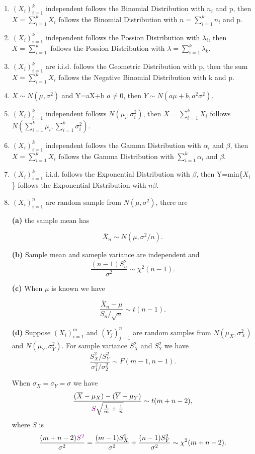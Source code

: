 \documentclass[landscape,12pt,a3paper]{article}
\begin{document}
\begin{enumerate}

\item $\displaystyle (X_i)_{i=1}^k$ independent follows the Binomial Distribution with $n_i$ and p, then $X=\sum_{i=1}^kX_i$ follows the Binomial Distribution with $n=\sum_{i=1}^kn_i$ and p.

\item $(X_i)_{i=1}^k$ independent follows the Possion Distribution with $\lambda_i$, then $X=\sum_{i=1}^k$ follows the Possion Distribution with $\lambda=\sum_{i=1}^k\lambda_k$.

\item $(X_i)_{i=1}^k$ are i.i.d. follows the Geometric Distribution with p, then the sum $X=\sum_{i=1}^kX_i$ follows the Negative Binomial Distribution with k and p.

\item $X\sim N(\mu,\sigma^2)$ and Y=aX+b $a\neq 0$, then $Y\sim N(a\mu+b,a^2\sigma^2)$.

\item $(X_i)_{i=1}^k$ independent follows $N(\mu_i,\sigma_i^2)$, then $X=\sum_{i=1}^kX_i$ follows $N(\sum_{i=1}^k\mu_i,\sum_{i=1}^k\sigma_i^2)$.

\item $(X_i)_{i=1}^k$ independent follows the Gamma Distribution with $\alpha_i$ and $\beta$, then $X=\sum_{i=1}^kX_i$ follows the Gamma Distribution with $\sum_{i=1}^k\alpha_i$ and $\beta$.

\item $(X_i)_{i=1}^k$ i.i.d. follows the Exponential Distribution with $\beta$, then Y=min\{$X_i$\} follows the Exponential Distribution with $n\beta$.

\item $(X_i)_{i=1}^n$ are random sample from $N(\mu,\sigma^2)$, there are 

{\bf (a)} the sample mean has

$$\overline{X}_n \sim N(\mu, \sigma^2/n).$$


{\bf (b)} Sample mean and sameple variance are independent and
$$\frac{(n-1)S_n^2}{\sigma^2} \sim \chi^2(n-1).$$


{\bf (c)} When $\mu$ is known we have

$$\frac{\overline{X}_n -\mu}{S_n/\sqrt{n}} \sim t(n-1).$$


{\bf (d)} Suppose $(X_i)_{i=1}^{m}$ and $(Y_j)_{j=1}^{n}$ are random samples from $N(\mu_X, \sigma_X^2)$ and $N(\mu_Y, \sigma_Y^2)$. For sample variance $S_X^2$ and $S_Y^2$ we have
$$\frac{S_{X}^2 / S_Y^2}{\sigma_1^2/ \sigma_2^2}\sim F(m-1, n-1).$$ 

When $\sigma_X=\sigma_Y=\sigma$ we have
\[
\frac{(\overline{X} -\mu_X) - (\overline{Y}-\mu_Y)}{{\color{violet}S}\sqrt{\frac{1}{m}+\frac{1}{n}}} \sim t(m+n-2),
\]
where {\color{violet}$S$} is
\[
\frac{(m+n-2){\color{violet}S^2}}{\sigma^2}
=
\frac{(m-1)S_X^2}{\sigma^2}
+ 
\frac{(n-1)S_Y^2}{\sigma^2}
\sim \chi^2(m+n-2).
\]

\end{enumerate}
\end{document}
